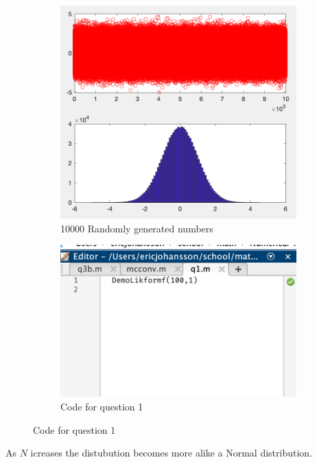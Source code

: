\documentclass{article}
\begin{document}
\begin{figure}[H]
    \begin{subfigure}[h]{0.4\linewidth}
        \includegraphics[width=\linewidth]{./imgs/q1a_1000000.png}
        \caption{10000 Randomly generated numbers}
    \end{subfigure}
    \hfill
    \begin{subfigure}[h]{0.4\linewidth}
        \includegraphics[width=\linewidth]{./imgs/q1_code.png}
        \caption{Code for question 1}
    \end{subfigure}
\end{figure}
As \( N \) icreases the distubution becomes more alike a Normal distribution.
\end{document}
